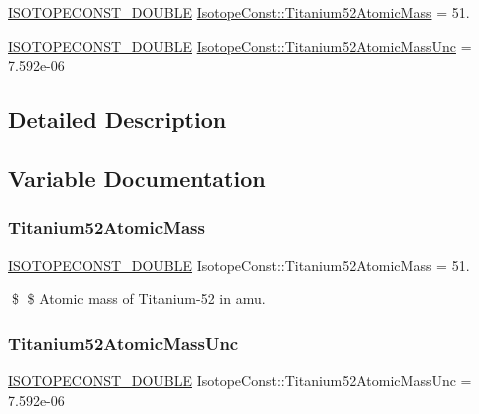 \begin{DoxyCompactItemize}
\item 
\mbox{\hyperlink{group___isotope_const-_macros_ga8f45a7272ce02c0b4c65c44636ed719a}{I\+S\+O\+T\+O\+P\+E\+C\+O\+N\+S\+T\+\_\+\+D\+O\+U\+B\+LE}} \mbox{\hyperlink{group___isotope_const-_titanium-_ti52_ga7b3292628352d5f5b942fff3e0755f86}{Isotope\+Const\+::\+Titanium52\+Atomic\+Mass}} = 51.
\item 
\mbox{\hyperlink{group___isotope_const-_macros_ga8f45a7272ce02c0b4c65c44636ed719a}{I\+S\+O\+T\+O\+P\+E\+C\+O\+N\+S\+T\+\_\+\+D\+O\+U\+B\+LE}} \mbox{\hyperlink{group___isotope_const-_titanium-_ti52_gad1d18df5dc0b987067c6f42282bdf130}{Isotope\+Const\+::\+Titanium52\+Atomic\+Mass\+Unc}} = 7.\+592e-\/06
\end{DoxyCompactItemize}


\subsection{Detailed Description}


\subsection{Variable Documentation}
\mbox{\label{group___isotope_const-_titanium-_ti52_ga7b3292628352d5f5b942fff3e0755f86}} 
\subsubsection{\texorpdfstring{Titanium52\+Atomic\+Mass}{Titanium52AtomicMass}}
{\footnotesize\ttfamily \mbox{\hyperlink{group___isotope_const-_macros_ga8f45a7272ce02c0b4c65c44636ed719a}{I\+S\+O\+T\+O\+P\+E\+C\+O\+N\+S\+T\+\_\+\+D\+O\+U\+B\+LE}} Isotope\+Const\+::\+Titanium52\+Atomic\+Mass = 51.}

\$ \$ Atomic mass of Titanium-\/52 in amu. \mbox{\label{group___isotope_const-_titanium-_ti52_gad1d18df5dc0b987067c6f42282bdf130}} 
\subsubsection{\texorpdfstring{Titanium52\+Atomic\+Mass\+Unc}{Titanium52AtomicMassUnc}}
{\footnotesize\ttfamily \mbox{\hyperlink{group___isotope_const-_macros_ga8f45a7272ce02c0b4c65c44636ed719a}{I\+S\+O\+T\+O\+P\+E\+C\+O\+N\+S\+T\+\_\+\+D\+O\+U\+B\+LE}} Isotope\+Const\+::\+Titanium52\+Atomic\+Mass\+Unc = 7.\+592e-\/06}


